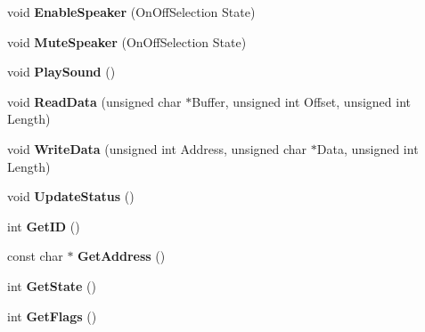 \begin{DoxyCompactItemize}
\item 
\hypertarget{class_c_wiimote_af1a936c6f362670eea3663dd15219bd8}{void {\bfseries \-Enable\-Speaker} (\-On\-Off\-Selection \-State)}\label{class_c_wiimote_af1a936c6f362670eea3663dd15219bd8}

\item 
\hypertarget{class_c_wiimote_aab77d7cd365cea3a7d1e8bdbff07de38}{void {\bfseries \-Mute\-Speaker} (\-On\-Off\-Selection \-State)}\label{class_c_wiimote_aab77d7cd365cea3a7d1e8bdbff07de38}

\item 
\hypertarget{class_c_wiimote_a80afecda83601b7e3b33087500b05c84}{void {\bfseries \-Play\-Sound} ()}\label{class_c_wiimote_a80afecda83601b7e3b33087500b05c84}

\item 
\hypertarget{class_c_wiimote_a2894de3f305f27ec1f47d896659a8037}{void {\bfseries \-Read\-Data} (unsigned char $\ast$\-Buffer, unsigned int \-Offset, unsigned int \-Length)}\label{class_c_wiimote_a2894de3f305f27ec1f47d896659a8037}

\item 
\hypertarget{class_c_wiimote_a048e1a9f0612b58b6201ab0f88c7df6c}{void {\bfseries \-Write\-Data} (unsigned int \-Address, unsigned char $\ast$\-Data, unsigned int \-Length)}\label{class_c_wiimote_a048e1a9f0612b58b6201ab0f88c7df6c}

\item 
\hypertarget{class_c_wiimote_aa175e0730a9e68334c010119a280720d}{void {\bfseries \-Update\-Status} ()}\label{class_c_wiimote_aa175e0730a9e68334c010119a280720d}

\item 
\hypertarget{class_c_wiimote_aff65f1d90f0fd1a989f0566385276eeb}{int {\bfseries \-Get\-I\-D} ()}\label{class_c_wiimote_aff65f1d90f0fd1a989f0566385276eeb}

\item 
\hypertarget{class_c_wiimote_a0df092c0ad66746f24793a088ff46e6a}{const char $\ast$ {\bfseries \-Get\-Address} ()}\label{class_c_wiimote_a0df092c0ad66746f24793a088ff46e6a}

\item 
\hypertarget{class_c_wiimote_a0b4b626beab4475fa349de8943c7b24f}{int {\bfseries \-Get\-State} ()}\label{class_c_wiimote_a0b4b626beab4475fa349de8943c7b24f}

\item 
\hypertarget{class_c_wiimote_a2900db59b2eb728f9db885ec1c9aa5e4}{int {\bfseries \-Get\-Flags} ()}\label{class_c_wiimote_a2900db59b2eb728f9db885ec1c9aa5e4}


\end{DoxyCompactItemize}
